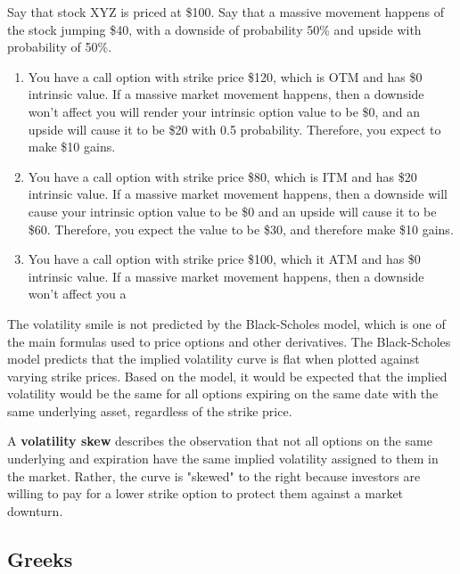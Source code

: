 \documentclass{article}
\begin{document}
\begin{example}[EDIT]
Say that stock XYZ is priced at \$100. Say that a massive movement happens of the stock jumping \$40, with a downside of probability 50\% and upside with probability of 50\%. 
\begin{enumerate}
    \item You have a call option with strike price \$120, which is OTM and has \$0 intrinsic value. If a massive market movement happens, then a downside won't affect you will render your intrinsic option value to be \$0, and an upside will cause it to be \$20 with 0.5 probability. Therefore, you expect to make \$10 gains.  
    \item You have a call option with strike price \$80, which is ITM and has \$20 intrinsic value. If a massive market movement happens, then a downside will cause your intrinsic option value to be \$0 and an upside will cause it to be \$60. Therefore, you expect the value to be \$30, and therefore make \$10 gains. 
    \item You have a call option with strike price \$100, which it ATM and has \$0 intrinsic value. If a massive market movement happens, then a downside won't affect you a
\end{enumerate}
\end{example}

The volatility smile is not predicted by the Black-Scholes model, which is one of the main formulas used to price options and other derivatives. The Black-Scholes model predicts that the implied volatility curve is flat when plotted against varying strike prices. Based on the model, it would be expected that the implied volatility would be the same for all options expiring on the same date with the same underlying asset, regardless of the strike price. 

\begin{definition}
A \textbf{volatility skew} describes the observation that not all options on the same underlying and expiration have the same implied volatility assigned to them in the market. Rather, the curve is "skewed" to the right because investors are willing to pay for a lower strike option to protect them against a market downturn. 
\begin{center}
\end{center}
\end{definition}



\subsection{Greeks}
\end{document}

